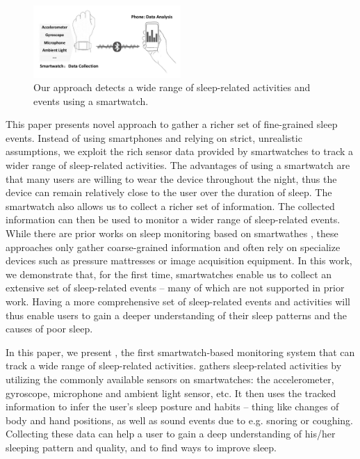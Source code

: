 \begin{figure}[!t]
\centering
\setlength{\belowcaptionskip}{-13pt}
      \includegraphics[width=0.5\textwidth]{Figures/datacollect.pdf}
  \caption{Our approach detects a wide range of sleep-related activities and events using a smartwatch.}\label{fig:datacollect}
\end{figure}

This paper presents novel approach to gather a richer set of fine-grained sleep events. Instead of using smartphones and relying on strict,
unrealistic assumptions, we exploit the rich sensor data provided by smartwatches to track a wider range of sleep-related activities. The
advantages of using a smartwatch are that many users are willing to wear the device throughout the night, thus the device can remain
relatively close to the user over the duration of sleep. The smartwatch also allows us to collect a richer set of information. The
collected information can then be used to monitor a wider range of sleep-related events. While there are prior works on sleep monitoring
based on smartwathes \cite{pombo2016ubisleep,shelgikar2016sleep,haescher2015anomaly,borazio2012combining}, these approaches only gather
coarse-grained information and often rely on specialize devices such as pressure mattresses or image acquisition equipment. In this work,
we demonstrate that, for the first time, smartwatches enable us to collect an extensive set of sleep-related events -- many of which are
not supported in prior work. Having a more comprehensive set of sleep-related events and activities will thus enable users to gain a deeper
understanding of their sleep patterns and the causes of poor sleep.



In this paper, we present \systemname, the first smartwatch-based monitoring system that can track a wide range of sleep-related
activities. \systemname gathers sleep-related activities by utilizing the commonly available sensors on smartwatches: the accelerometer,
gyroscope, microphone and ambient light sensor, etc. It then uses the tracked information to infer the user's sleep posture and habits --
thing like changes of body and hand positions, as well as sound events due to e.g. snoring or coughing.  Collecting these data can help a
user to gain a deep understanding of his/her sleeping pattern and quality, and to find ways to improve sleep.

